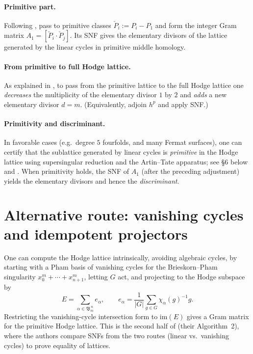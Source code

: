 \documentclass[11pt]{article}
\theoremstyle{definition}
\begin{document}
\paragraph{Primitive part.} Following \cite[\S3.1]{AMV2019}, pass to primitive classes \( \check P_i:=P_i-P_1\) and form the integer Gram matrix \(A_1=[\check P_i\cdot \check P_j]\). Its SNF gives the elementary divisors of the lattice generated by the linear cycles in primitive middle homology.

\paragraph{From primitive to full Hodge lattice.}
As explained in \cite[\S3.3]{AMV2019}, to pass from the primitive lattice to the full Hodge lattice one \emph{decreases} the multiplicity of the elementary divisor \(1\) by \(2\) and \emph{adds} a new elementary divisor \(d=m\). (Equivalently, adjoin \(h^p\) and apply SNF.)

\paragraph{Primitivity and discriminant.}
In favorable cases (e.g.\ degree \(5\) fourfolds, and many Fermat surfaces), one can certify that the sublattice generated by linear cycles is \emph{primitive} in the Hodge lattice using supersingular reduction and the Artin--Tate apparatus; see \S6 below and \cite{AMV2019,SchuettShiodaVanLuijk2009}. When primitivity holds, the SNF of \(A_1\) (after the preceding adjustment) yields the elementary divisors and hence the \emph{discriminant}.

\section{Alternative route: vanishing cycles and idempotent projectors}
One can compute the Hodge lattice intrinsically, avoiding algebraic cycles, by starting with a Pham basis of vanishing cycles for the Brieskorn--Pham singularity \(x_0^m+\cdots+x_{n+1}^m\), letting \(G\) act, and projecting to the Hodge subspace by
\[
E=\sum_{\alpha\in\mathfrak B_m^{\,n}} e_\alpha,\qquad
e_\alpha=\frac{1}{|G|}\sum_{g\in G}\chi_\alpha(g)^{-1} g.
\]
Restricting the vanishing-cycle intersection form to \(\mathrm{im}(E)\) gives a Gram matrix for the primitive Hodge lattice. This is the second half of \cite{AMV2019} (their Algorithm~2), where the authors compare SNFs from the two routes (linear vs.\ vanishing cycles) to prove equality of lattices.
\end{document}
